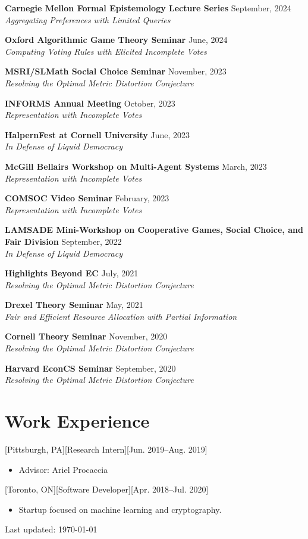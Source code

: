 \documentclass{article}
\begin{document}
\textbf{Carnegie Mellon Formal Epistemology Lecture Series} \hfill September, 2024 \\
\textit{Aggregating Preferences with Limited Queries}

\textbf{Oxford Algorithmic Game Theory Seminar} \hfill June, 2024 \\
\textit{Computing Voting Rules with Elicited Incomplete Votes}

\textbf{MSRI/SLMath Social Choice Seminar} \hfill November, 2023 \\
\textit{Resolving the Optimal Metric Distortion Conjecture}

\textbf{INFORMS Annual Meeting} \hfill October, 2023 \\
\textit{Representation with Incomplete Votes}

\textbf{HalpernFest at Cornell University} \hfill June, 2023 \\
\textit{In Defense of Liquid Democracy}

\textbf{McGill Bellairs Workshop on Multi-Agent Systems} \hfill March, 2023 \\
\textit{Representation with Incomplete Votes}

\textbf{COMSOC Video Seminar} \hfill February, 2023 \\
\textit{Representation with Incomplete Votes}

\textbf{LAMSADE Mini-Workshop on Cooperative Games, Social Choice, and Fair Division} \hfill September, 2022 \\
\textit{In Defense of Liquid Democracy}

\textbf{Highlights Beyond EC} \hfill July, 2021 \\
\textit{Resolving the Optimal Metric Distortion Conjecture}

\textbf{Drexel Theory Seminar} \hfill May, 2021 \\
\textit{Fair and Efficient Resource Allocation with Partial Information}

\textbf{Cornell Theory Seminar} \hfill November, 2020 \\
\textit{Resolving the Optimal Metric Distortion Conjecture}

\textbf{Harvard EconCS Seminar} \hfill September, 2020 \\
\textit{Resolving the Optimal Metric Distortion Conjecture}

\section{Work Experience}
    [Pittsburgh, PA][Research Intern][Jun. 2019--Aug. 2019]
    \begin{itemize}[noitemsep,nolistsep]
        \item Advisor: Ariel Procaccia
    \end{itemize}
    [Toronto, ON][Software Developer][Apr. 2018--Jul. 2020]
    \begin{itemize}[noitemsep,nolistsep]
        \item Startup focused on machine learning and cryptography. 
    \end{itemize}


    \vfill
\begin{center}
    Last updated: \today
\end{center}
    
\end{document}
